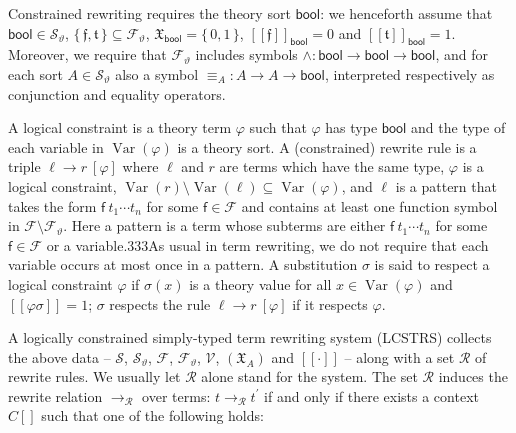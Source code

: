 Constrained rewriting requires the theory sort $\mathsf{bool}$: we henceforth assume that $\mathsf{bool}\in{\mathcal{S}}_{\vartheta}$, $\{\,\mathfrak{f},\mathfrak{t}\,\}\subseteq{\mathcal{F}}_{\vartheta}$, $\mathfrak{X}_{\mathsf{bool}}=\{\,0,1\,\}$, $[\![\mathfrak{f}]\!]_{\mathsf{bool}}=0$ and $[\![\mathfrak{t}]\!]_{\mathsf{bool}}=1$. Moreover, we require that ${\mathcal{F}}_{\vartheta}$ includes symbols $\wedge:\mathsf{bool}\rightarrow\mathsf{bool}\rightarrow\mathsf{bool}$, and for each sort $A\in{\mathcal{S}}_{\vartheta}$ also a symbol $\equiv_{A}:A\rightarrow A\rightarrow\mathsf{bool}$, interpreted respectively as conjunction and equality operators.\par
 
 
 
A logical constraint is a theory term $\varphi$ such that $\varphi$ has type $\mathsf{bool}$ and the type of each variable in $\operatorname{Var}(\varphi)$ is a theory sort. A (constrained) rewrite rule is a triple ${\ell}\rightarrow{r}\ [\varphi]$ where $\ell$ and $r$ are terms which have the same type, $\varphi$ is a logical constraint, $\operatorname{Var}(r)\setminus\operatorname{Var}(\ell)\subseteq\operatorname{Var}(\varphi)$, and $\ell$ is a pattern that takes the form ${\mathsf{f}}\ {{t}_{1}\cdots{t}_{n}}$ for some $\mathsf{f}\in\mathcal{F}$ and contains at least one function symbol in $\mathcal{F}\setminus{\mathcal{F}}_{\vartheta}$. Here a pattern is a term whose subterms are either ${\mathsf{f}}\ {{t}_{1}\cdots{t}_{n}}$ for some $\mathsf{f}\in\mathcal{F}$ or a variable.333As usual in term rewriting, we do not require that each variable occurs at most once in a pattern. A substitution $\sigma$ is said to respect a logical constraint $\varphi$ if $\sigma(x)$ is a theory value for all $x\in\operatorname{Var}(\varphi)$ and $[\![\varphi\sigma]\!]=1$; $\sigma$ respects the rule ${\ell}\rightarrow{r}\ [\varphi]$ if it respects $\varphi$.\par
 
 
 
A logically constrained simply-typed term rewriting system (LCSTRS) collects the above data – $\mathcal{S}$, ${\mathcal{S}}_{\vartheta}$, $\mathcal{F}$, ${\mathcal{F}}_{\vartheta}$, $\mathcal{V}$, $(\mathfrak{X}_{A})$ and $[\![\cdot]\!]$ – along with a set $\mathcal{R}$ of rewrite rules. We usually let $\mathcal{R}$ alone stand for the system. The set $\mathcal{R}$ induces the rewrite relation $\rightarrow_{\mathcal{R}}$ over terms: $t\rightarrow_{\mathcal{R}}t^{\prime}$ if and only if there exists a context ${C}[]$ such that one of the following holds:\par
  
